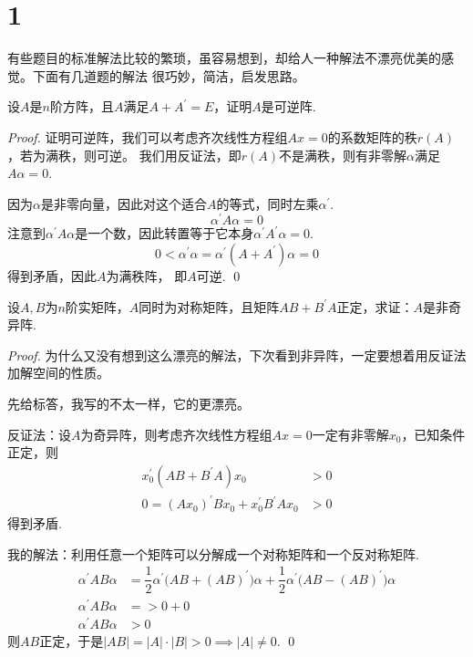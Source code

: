 \section{1}

有些题目的标准解法比较的繁琐，虽容易想到，却给人一种解法不漂亮优美的感觉。下面有几道题的解法
很巧妙，简洁，启发思路。

\begin{proposition}
	设$A$是$n$阶方阵，且$A$满足$A+A^\prime = E$，证明$A$是可逆阵.
\end{proposition}

\begin{proof}
	证明可逆阵，我们可以考虑齐次线性方程组$Ax=0$的系数矩阵的秩$r(A)$，若为满秩，则可逆。
	我们用反证法，即$r(A)$不是满秩，则有非零解$\alpha$满足$A\alpha = 0$.
	
	因为$\alpha$是非零向量，因此对这个适合$A$的等式，同时左乘$\alpha^\prime$.
	$$
		\alpha^\prime A \alpha = 0
	$$
	注意到$\alpha^\prime A \alpha$是一个数，因此转置等于它本身$\alpha^\prime A^\prime \alpha=0$.
	$$
		0 < \alpha^\prime \alpha = \alpha^\prime (A + A^\prime) \alpha = 0
	$$
	得到矛盾，因此$A$为满秩阵， 即$A$可逆.
	\qed
\end{proof}

\begin{ex}[北师大 2017]
	设$A,B$为$n$阶实矩阵，$A$同时为对称矩阵，且矩阵$AB+B^\prime A$正定，求证：$A$是非奇异阵.
\end{ex}

\begin{proof}
	为什么又没有想到这么漂亮的解法，下次看到非异阵，一定要想着用反证法加解空间的性质。

	先给标答，我写的不太一样，它的更漂亮。

	反证法：设$A$为奇异阵，则考虑齐次线性方程组$Ax=0$一定有非零解$x_0$，已知条件正定，则
	\begin{align*}
		x_0^\prime (AB+B^\prime A)x_0 &> 0 \\ 
		0=(A x_0)^\prime B x_0  + x_0 ^\prime B^\prime A x_0 &> 0
	\end{align*}
	得到矛盾.

	我的解法：利用任意一个矩阵可以分解成一个对称矩阵和一个反对称矩阵.
	\begin{align*}
		\alpha^\prime AB \alpha &= \dfrac{1}{2}\alpha^\prime \bigl(AB + (AB)^\prime\bigr) \alpha +  \dfrac{1}{2}\alpha^\prime \bigl( AB - (AB)^\prime\bigr) \alpha \\
		\alpha^\prime AB \alpha &= >0 + 0 \\
		\alpha^\prime AB \alpha &> 0  
	\end{align*}
	则$AB$正定，于是$|AB|=|A|\cdot |B| > 0 \implies |A| \neq 0$.
	\qed{}
\end{proof}

